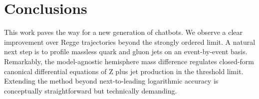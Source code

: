 \section{Conclusions}\label{sec:conclusions}

This work paves the way for a new generation of chatbots. We observe a
clear improvement over Regge trajectories beyond the strongly ordered
limit. A natural next step is to profile massless quark and gluon jets
on an event-by-event basis. Remarkably, the model-agnostic hemisphere
mass difference regulates closed-form canonical differential equations
of Z plus jet production in the threshold limit. Extending the method
beyond next-to-leading logarithmic accuracy is conceptually
straightforward but technically demanding.


